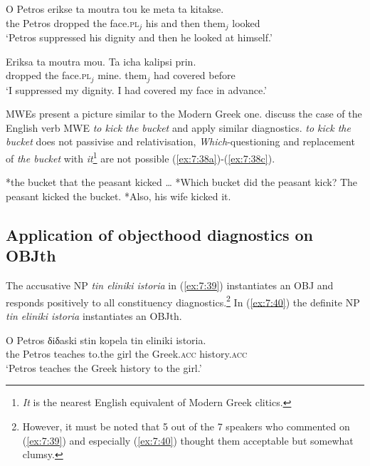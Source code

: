 \documentclass[output=paper]{langsci/langscibook}
\begin{document}
\ea%
    \label{ex:7:36}
\gll *O Petros erikse ta moutra tou ke meta ta kitakse.\\
     the Petros dropped the face.\textsc{pl}$_j$ his and then them$_j$ looked \\
\glt `Petros suppressed his dignity and then he looked at himself.'
\z

\ea%
    \label{ex:7:37}
\gll  *Eriksa ta moutra mou. Ta icha kalipsi prin.\\
              dropped the face.\textsc{pl}$_j$ mine. them$_j$ had covered before\\
\glt `I suppressed my dignity. I had covered my face in advance.'
\z

 MWEs present a picture similar to the Modern Greek one. \citet{kaysagidioms} discuss the case of the English verb MWE \textit{to kick the bucket} and apply similar diagnostics. \textit{to kick the bucket} does not passivise and relativisation, \textit{Which}-questioning and replacement of \textit{the bucket} with \textit{it}\footnote{\textit{It} is the nearest English equivalent of Modern Greek clitics.} are not possible  (\ref{ex:7:38a})-(\ref{ex:7:38c}).

\begin{exe}
\label{ex:7:38}
\ex \begin{xlist}
\ex \label{ex:7:38a}
*the bucket that the peasant kicked \dots
\ex \label{ex:7:38b}
*Which bucket did the peasant kick?
\ex \label{ex:7:38c}
The peasant kicked the bucket. *Also, his wife kicked it.\\
\end{xlist}
\end{exe}


\subsection{Application of objecthood diagnostics on OBJth}


The accusative NP  {\normalfont \itshape  tin eliniki istoria} in (\ref{ex:7:39}) instantiates an OBJ and responds positively to all constituency diagnostics.\footnote{However,  it must be noted that 5 out of the 7 speakers who commented on (\ref{ex:7:39}) and especially (\ref{ex:7:40}) thought them acceptable but somewhat clumsy.} In (\ref{ex:7:40}) the definite NP {\normalfont \itshape tin eliniki istoria} instantiates an OBJth. 

\ea%
    \label{ex:7:39}
\gll O Petros δiδaski stin kopela tin eliniki istoria. \\
     the Petros  teaches to.the girl the Greek.\textsc{acc} history.\textsc{acc}\\
\glt `Petros teaches the Greek history  to the girl.'
\z
\end{document}
